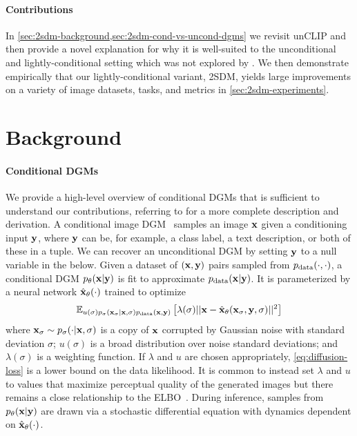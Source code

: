 \paragraph{Contributions} In \cref{sec:2sdm-background,sec:2sdm-cond-vs-uncond-dgms} we revisit unCLIP and then provide a novel explanation for why it is well-suited to the unconditional and lightly-conditional setting which was not explored by \citet{ramesh2022hierarchical}. We then demonstrate empirically that our lightly-conditional variant, 2SDM, yields large improvements on a variety of image datasets, tasks, and metrics in \cref{sec:2sdm-experiments}.

\section{Background} \label{sec:2sdm-background}
\paragraph{Conditional DGMs}
We provide a high-level overview of conditional DGMs that is sufficient to understand our contributions, referring to \citeauthor{karras2022elucidating} for a more complete description and derivation. A conditional image DGM~\citep{tashiro2021csdi} samples an image ${\mathbf{x}}$ given a conditioning input ${\mathbf{y}}$, where ${\mathbf{y}}$ can be, for example, a class label, a text description, or both of these in a tuple. We can recover an unconditional DGM by setting ${\mathbf{y}}$ to a null variable in the below. Given a dataset of $({\mathbf{x}},{\mathbf{y}})$ pairs sampled from $p_{\rm{data}}(\cdot,\cdot)$, a conditional DGM $p_\theta({\mathbf{x}}|{\mathbf{y}})$ is fit to approximate $p_{\rm{data}}({\mathbf{x}}|{\mathbf{y}})$. It is parameterized by a neural network $\hat{{\mathbf{x}}}_\theta(\cdot)$ trained to optimize
\begin{align}\label{eq:diffusion-loss}
    \mathbb{E}_{u(\sigma)p_\sigma({\mathbf{x}}_\sigma|{\mathbf{x}},\sigma)p_{\rm{data}}({\mathbf{x}},{\mathbf{y}})} \left[ \lambda(\sigma) \lvert\lvert {\mathbf{x}} - \hat{{\mathbf{x}}}_\theta({\mathbf{x}}_\sigma, {\mathbf{y}}, \sigma) \rvert\rvert^2 \right]
\end{align}
where ${\mathbf{x}}_\sigma \sim p_\sigma(\cdot|{\mathbf{x}},\sigma)$ is a copy of ${\mathbf{x}}$ corrupted by Gaussian noise with standard deviation $\sigma$; $u(\sigma)$ is a broad distribution over noise standard deviations; and $\lambda(\sigma)$ is a weighting function.
%
If $\lambda$ and $u$ are chosen appropriately, \cref{eq:diffusion-loss} is a lower bound on the data likelihood. It is common to instead set $\lambda$ and $u$ to values that maximize perceptual quality of the generated images but there remains  a close relationship to the ELBO~\citep{kingma2023understanding}. During inference, samples from $p_\theta({\mathbf{x}}|{\mathbf{y}})$ are drawn via a stochastic differential equation with dynamics dependent on $\hat{{\mathbf{x}}}_\theta(\cdot)$.



